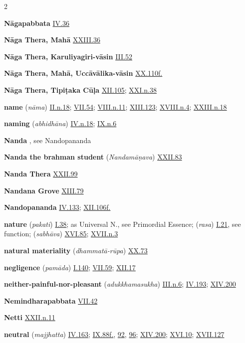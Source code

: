 \begin{multicols}{2}
\begin{vismHanging}
\par\textbf{Nāgapabbata} \hyperlink{IV.36}{IV.36}{}
\par\textbf{Nāga Thera, Mahā} \hyperlink{XXIII.36}{XXIII.36}{}
\par\textbf{Nāga Thera, Karuliyagiri-vāsin} \hyperlink{III.52}{III.52}{}
\par\textbf{Nāga Thera, Mahā, Uccāvālika-vāsin} \hyperlink{XX.110}{XX.110f.}{}
\par\textbf{Nāga Thera, Tipiṭaka Cūḷa} \hyperlink{XII.105}{XII.105}{}; \hyperlink{XXI.n38}{XXI.n.38}{}
\par\textbf{name} (\emph{nāma}) \hyperlink{II.n18}{II.n.18}{}; \hyperlink{VII.54}{VII.54}{}; \hyperlink{VIII.n11}{VIII.n.11}{}; \hyperlink{XIII.123}{XIII.123}{}; \hyperlink{XVIII.n4}{XVIII.n.4}{}; \hyperlink{XXIII.n18}{XXIII.n.18}{}
\par\textbf{naming} (\emph{abhidhāna}) \hyperlink{IV.n18}{IV.n.18}{}; \hyperlink{IX.n6}{IX.n.6}{}
\par\textbf{Nanda} , see Nandopananda
\par\textbf{Nanda the brahman student} (\emph{Nandamāṇava}) \hyperlink{XXII.83}{XXII.83}{}
\par\textbf{Nanda Thera} \hyperlink{XXII.99}{XXII.99}{}
\par\textbf{Nandana Grove} \hyperlink{XIII.79}{XIII.79}{}
\par\textbf{Nandopananda} \hyperlink{IV.133}{IV.133}{}; \hyperlink{XII.106}{XII.106f.}{}
\par\textbf{nature} (\emph{pakati}) \hyperlink{I.38}{I.38}{}; as Universal N., see Primordial Essence; (\emph{rasa}) \hyperlink{I.21}{I.21}{}, see function; (\emph{sabhāva}) \hyperlink{XVI.85}{XVI.85}{}; \hyperlink{XVII.n3}{XVII.n.3}{}
\par\textbf{natural materiality} (\emph{dhammatā-rūpa}) \hyperlink{XX.73}{XX.73}{}
\par\textbf{negligence} (\emph{pamāda}) \hyperlink{I.140}{I.140}{}; \hyperlink{VII.59}{VII.59}{}; \hyperlink{XII.17}{XII.17}{}
\par\textbf{neither-painful-nor-pleasant} (\emph{adukkhamasukha}) \hyperlink{III.n6}{III.n.6}{}; \hyperlink{IV.193}{IV.193}{}; \hyperlink{XIV.200}{XIV.200}{}
\par\textbf{Nemindharapabbata} \hyperlink{VII.42}{VII.42}{}
\par\textbf{Netti} \hyperlink{XXII.n11}{XXII.n.11}{}
\par\textbf{neutral} (\emph{majjhatta}) \hyperlink{IV.163}{IV.163}{}; \hyperlink{IX.88}{IX.88f.}{}, \hyperlink{IX.92}{92}{}, \hyperlink{IX.96}{96}{}; \hyperlink{XIV.200}{XIV.200}{}; \hyperlink{XVI.10}{XVI.10}{}; \hyperlink{XVII.127}{XVII.127}{}

\end{vismHanging}
\end{multicols}
